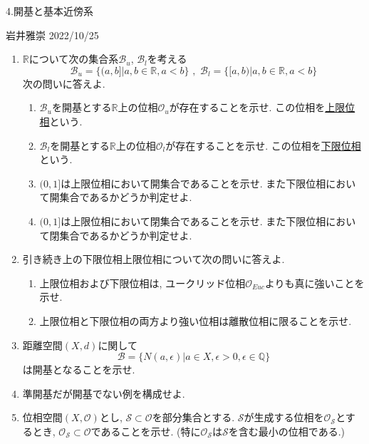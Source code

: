 \documentclass[dvipdfmx,a4paper,11pt]{article}
\newcommand{\R}{\mathbb{R}}
\newcommand{\Q}{\mathbb{Q}}
\theoremstyle{definition}
\begin{document}

\begin{center}
{\Large 4.開基と基本近傍系}
\end{center}

\begin{flushright}
 岩井雅崇 2022/10/25
\end{flushright}

\begin{enumerate}[ label=\textbf{問}4.\arabic*]


\item $\R$について次の集合系$\mathscr{B}_u$, $\mathscr{B}_l$を考える
$$
\mathscr{B}_u = \{(a,b]| a,b \in \R, a<b\} \,\,,\,\,
\mathscr{B}_l = \{[a,b)| a,b \in \R, a<b\}
$$
次の問いに答えよ.
	\begin{enumerate}
	\item $\mathscr{B}_u $を開基とする$\R$上の位相$\mathscr{O}_u$が存在することを示せ. この位相を\underline{上限位相}という.
	\item $\mathscr{B}_l$を開基とする$\R$上の位相$\mathscr{O}_l$が存在することを示せ. この位相を\underline{下限位相}という.
	\item $(0,1]$は上限位相において開集合であることを示せ. また下限位相において開集合であるかどうか判定せよ.
	\item $(0,1]$は上限位相において閉集合であることを示せ. また下限位相において閉集合であるかどうか判定せよ.
	\end{enumerate}
\item 引き続き上の下限位相上限位相について次の問いに答えよ.
	\begin{enumerate}
	\item 上限位相および下限位相は, ユークリッド位相$\mathscr{O}_{Euc}$よりも真に強いことを示せ.
	\item 上限位相と下限位相の両方より強い位相は離散位相に限ることを示せ.
	\end{enumerate}

\item 距離空間$(X,d)$に関して
$$\mathscr{B} = \{ N(a,\epsilon) | a \in X, \epsilon >0, \epsilon \in \Q\}
$$
は開基となることを示せ.
\item 準開基だが開基でない例を構成せよ.
\item 位相空間$(X, \mathscr{O})$とし, $\mathscr{S} \subset \mathscr{O}$を部分集合とする.
$\mathscr{S}$が生成する位相を$\mathscr{O}_{\mathscr{S}}$とするとき, $\mathscr{O}_{\mathscr{S}} \subset \mathscr{O}$であることを示せ. (特に$\mathscr{O}_{\mathscr{S}}$は$\mathscr{S}$を含む最小の位相である.)


\end{enumerate}
\end{document}

